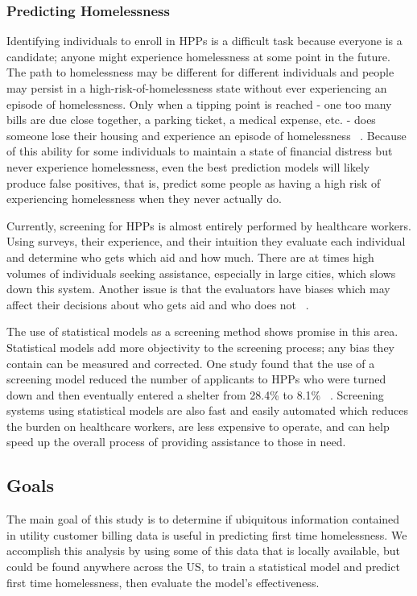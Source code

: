 \documentclass[10pt,letterpaper]{article}
\begin{document}
\subsubsection*{Predicting Homelessness}
Identifying individuals to enroll in HPPs is a difficult task because everyone is a candidate; anyone might experience homelessness at some point in the future. The path to homelessness may be different for different individuals and people may persist in a high-risk-of-homelessness state without ever experiencing an episode of homelessness. Only when a tipping point is reached - one too many bills are due close together, a parking ticket, a medical expense, etc. - does someone lose their housing and experience an episode of homelessness ~\cite{o2004wrong}. Because of this ability for some individuals to maintain a state of financial distress but never experience homelessness, even the best prediction models will likely produce false positives, that is, predict some people as having a high risk of experiencing homelessness when they never actually do.

Currently, screening for HPPs is almost entirely performed by healthcare workers. Using surveys, their experience, and their intuition they evaluate each individual and determine who gets which aid and how much. There are at times high volumes of individuals seeking assistance, especially in large cities, which slows down this system. Another issue is that the evaluators have biases which may affect their decisions about who gets aid and who does not ~\cite{shinn2019homelessness}.

The use of statistical models as a screening method shows promise in this area. Statistical models add more objectivity to the screening process; any bias they contain can be measured and corrected. One study found that the use of a screening model reduced the number of applicants to HPPs who were turned down and then eventually entered a shelter from 28.4\% to 8.1\% ~\cite{shinn2019homelessness}. Screening systems using statistical models are also fast and easily automated which reduces the burden on healthcare workers, are less expensive to operate, and can help speed up the overall process of providing assistance to those in need.

\subsection*{Goals}
The main goal of this study is to determine if ubiquitous information contained in utility customer billing data is useful in predicting first time homelessness. We accomplish this analysis by using some of this data that is locally available, but could be found anywhere across the US, to train a statistical model and predict first time homelessness, then evaluate the model's effectiveness.
\end{document}
